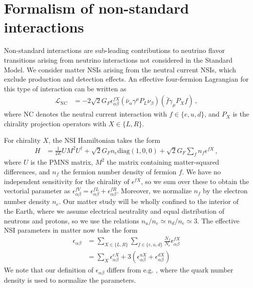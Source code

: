 \documentclass{revtex4-2}
\newcommand{\ab}{\alpha\beta}
\begin{document}
\section{Formalism of non-standard interactions}\label{sec:intro}
Non-standard interactions are sub-leading contributions to neutrino flavor transitions arising from neutrino interactions not considered in the Standard Model.
We consider matter NSIs arising from the neutral current NSIs, which exclude production 
and detection effects. An effective four-fermion Lagrangian for this type of interaction can be written as
\begin{align}
   \mathcal{L}_{\mathrm{NC}} &= -2 \sqrt{2} G_{F} \epsilon_{\alpha \beta}^{f X}\left(\bar{\nu}_{\alpha} \gamma^{\mu} P_{L} \nu_{\beta}\right)\left(\bar{f} \gamma_{\mu} P_{X} f\right)\,,
\end{align}
where NC denotes the neutral current interaction with 
$f \in \{e,u,d\}$, and $P_X$ is the chirality projection operators with $X \in \{L,R\}$.

For chirality $X$, the NSI Hamiltonian takes the form 
\begin{align}
   H &= \frac{1}{2E} UM^2U^\dagger + \sqrt{2}G_F n_e \text{diag}(1,0,0) + \sqrt{2}G_F \sum_f n_f \epsilon^{fX}\,,
\end{align}
where $U$ is the PMNS matrix, $M^2$ the matrix containing matter-squared differences, and $n_f$ the fermion number density
of fermion $f$.
We have no independent sensitivity for the chirality of $\epsilon^{fX}$, so we sum over these to obtain the vectorial parameter as $\epsilon^{fV}_{\alpha\beta} = \epsilon^{fL}_{\alpha\beta}+ \epsilon^{fR}_{\alpha\beta}$.
Moreover, we normalize $n_f$ by
the electron number density $n_e$. Our matter study will be wholly confined to the interior of the Earth, where we assume electrical neutrality and equal distribution of neutrons and protons, 
so we use the relations $n_u/n_e \simeq n_d/n_e \simeq 3$.
The effective NSI parameters in matter now take the form
\begin{align} \label{eq:epsilon}
    \epsilon_{\alpha\beta} &= \sum_{X \in \{L,R\}} \sum_{f \in \{e,u,d\}} \frac{N_f}{N_e} \epsilon^{fX}_{\alpha\beta} \nonumber \\
                           &= \sum_X \epsilon_{\ab}^{eX} + 3(\epsilon_{\ab}^{uX} + \epsilon_{\ab}^{dX})
\end{align}
We note that our definition of $\epsilon_{\alpha\beta}$ differs from e.g. \cite{deepcoreNSI}, where the quark number density is used to normalize
the parameters.
\end{document}
